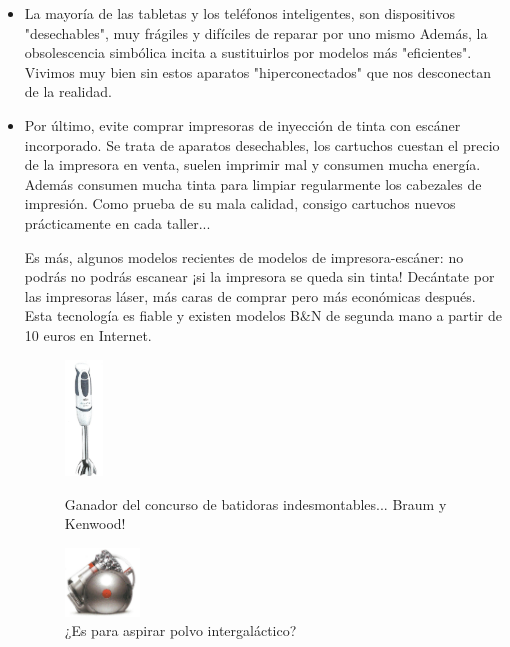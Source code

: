 \documentclass[a5paper,twoside,openany]{book}
\begin{document}
\begin{itemize}
\item La mayoría de las tabletas y los teléfonos inteligentes, son dispositivos "desechables", muy frágiles y difíciles de reparar por uno mismo Además, la obsolescencia simbólica incita a sustituirlos por modelos más "eficientes". Vivimos muy bien sin estos aparatos "hiperconectados" que nos desconectan de la realidad.

\item Por último, evite comprar impresoras de inyección de tinta con escáner incorporado. Se trata de aparatos desechables, los cartuchos cuestan el precio de la impresora en venta, suelen imprimir mal y consumen mucha energía. Además consumen mucha tinta para limpiar regularmente los cabezales de impresión. Como prueba de su mala calidad, consigo cartuchos nuevos prácticamente en cada taller...

Es más, algunos modelos recientes de modelos de impresora-escáner: no podrás no podrás escanear ¡si la impresora se queda sin tinta! Decántate por las impresoras láser, más caras de comprar pero más económicas después. Esta tecnología es fiable y existen modelos B\&N de segunda mano a partir de 10 euros en Internet.

\begin{figure}[h]
    \centering
    \begin{minipage}[b]{0.4\textwidth}
        \centering
        \includegraphics[width=1cm]{braum-mixer} 
        \caption*{Ganador del concurso de batidoras indesmontables... Braum y Kenwood!}
    \end{minipage}
    \hfill
    \begin{minipage}[b]{0.4\textwidth}
        \centering
        \includegraphics[width=2cm]{Dyson} 
        \caption*{¿Es para aspirar polvo intergaláctico?}
    \end{minipage}
\end{figure}



\end{itemize}
\end{document}
